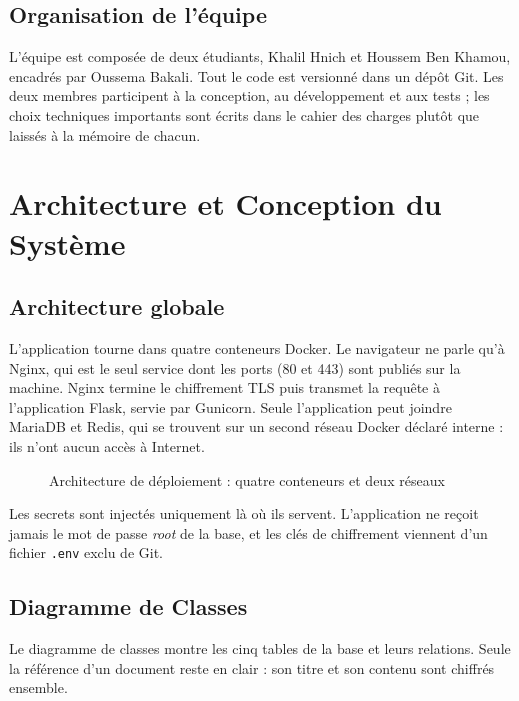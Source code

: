 \documentclass[12pt,a4paper]{report}
\newcommand{\code}[1]{\texttt{\NoAutoSpacing #1}}
\begin{document}
\section{Organisation de l'équipe}

L'équipe est composée de deux étudiants, Khalil Hnich et Houssem Ben Khamou, encadrés par Oussema Bakali. Tout le code est versionné dans un dépôt Git. Les deux membres participent à la conception, au développement et aux tests ; les choix techniques importants sont écrits dans le cahier des charges plutôt que laissés à la mémoire de chacun.

\chapter{Architecture et Conception du Système}

\section{Architecture globale}

L'application tourne dans quatre conteneurs Docker. Le navigateur ne parle qu'à Nginx, qui est le seul service dont les ports (80 et 443) sont publiés sur la machine. Nginx termine le chiffrement TLS puis transmet la requête à l'application Flask, servie par Gunicorn. Seule l'application peut joindre MariaDB et Redis, qui se trouvent sur un second réseau Docker déclaré \og interne \fg{} : ils n'ont aucun accès à Internet.

\begin{figure}[H]
\centering
{}
\caption{Architecture de déploiement : quatre conteneurs et deux réseaux}
\end{figure}

Les secrets sont injectés uniquement là où ils servent. L'application ne reçoit jamais le mot de passe \emph{root} de la base, et les clés de chiffrement viennent d'un fichier \code{.env} exclu de Git.

\section{Diagramme de Classes}

Le diagramme de classes montre les cinq tables de la base et leurs relations. Seule la référence d'un document reste en clair : son titre et son contenu sont chiffrés ensemble.
\end{document}
